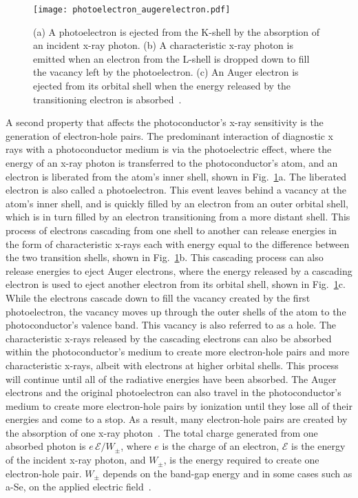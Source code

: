 \begin{figure}
\texttt{[image: photoelectron\_augerelectron.pdf]}
\caption{(a) A photoelectron is ejected from the K-shell by the absorption of an incident x-ray photon. (b) A characteristic x-ray photon is emitted when an electron from the L-shell is dropped down to fill the vacancy left by the photoelectron. (c) An Auger electron is ejected from its orbital shell when the energy released by the transitioning electron is absorbed~\citep{wiki_photoelectric}.}
\label{fig:photoelectric}
\end{figure}

A second property that affects the photoconductor's x-ray sensitivity is the generation of electron-hole pairs.  The predominant interaction of diagnostic x rays with a photoconductor medium is via the photoelectric effect, where the energy of an x-ray photon is transferred to the photoconductor's atom, and an electron is liberated from the atom's inner shell, shown in Fig.~\ref{fig:photoelectric}a.  The liberated electron is also called a photoelectron.  This event leaves behind a vacancy at the atom's inner shell, and is quickly filled by an electron from an outer orbital shell, which is in turn filled by an electron transitioning from a more distant shell.  This process of electrons cascading from one shell to another can release energies in the form of characteristic x-rays each with energy equal to the difference between the two transition shells, shown in Fig.~\ref{fig:photoelectric}b.  This cascading process can also release energies to eject Auger electrons, where the energy released by a cascading electron is used to eject another electron from its orbital shell, shown in Fig.~\ref{fig:photoelectric}c.  While the electrons cascade down to fill the vacancy created by the first photoelectron, the vacancy moves up through the outer shells of the atom to the photoconductor's valence band.  This vacancy is also referred to as a hole.  The characteristic x-rays released by the cascading electrons can also be absorbed within the photoconductor's medium to create more electron-hole pairs and more characteristic x-rays, albeit with electrons at higher orbital shells.  This process will continue until all of the radiative energies have been absorbed.  The Auger electrons and the original photoelectron can also travel in the photoconductor's medium to create more electron-hole pairs by ionization until they lose all of their energies and come to a stop.  As a result, many electron-hole pairs are created by the absorption of one x-ray photon~\citep{Bushberg2002, Hajdok2006}.  The total charge generated from one absorbed photon is $e \, \mathcal{E} / W_{\pm}$, where $e$ is the charge of an electron, $\mathcal{E}$ is the energy of the incident x-ray photon, and $W_{\pm}$, is the energy required to create one electron-hole pair.  $W_{\pm}$ depends on the band-gap energy and in some cases such as a-Se, on the applied electric field~\citep{kasap2006}.
    
